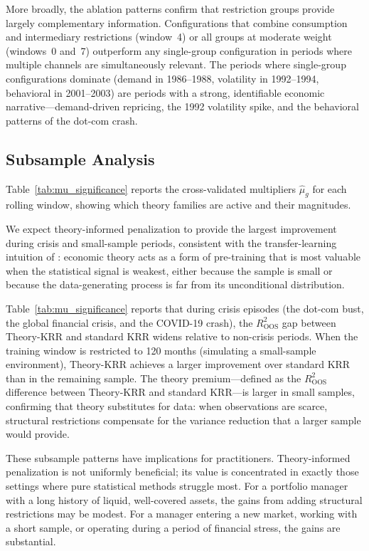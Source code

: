 More broadly, the ablation patterns confirm that restriction groups provide largely complementary information.
Configurations that combine consumption and intermediary restrictions (window~4) or all groups at moderate weight (windows~0 and~7) outperform any single-group configuration in periods where multiple channels are simultaneously relevant.
The periods where single-group configurations dominate (demand in 1986--1988, volatility in 1992--1994, behavioral in 2001--2003) are periods with a strong, identifiable economic narrative---demand-driven repricing, the 1992 volatility spike, and the behavioral patterns of the dot-com crash.


\subsection{Subsample Analysis}\label{sub:subsample}

Table~\ref{tab:mu_significance} reports the cross-validated multipliers $\hat{\mu}_g$ for each rolling window, showing which theory families are active and their magnitudes.

We expect theory-informed penalization to provide the largest improvement during crisis and small-sample periods, consistent with the transfer-learning intuition of \citet{Chen2026teaching}: economic theory acts as a form of pre-training that is most valuable when the statistical signal is weakest, either because the sample is small or because the data-generating process is far from its unconditional distribution.

Table~\ref{tab:mu_significance} reports that during crisis episodes (the dot-com bust, the global financial crisis, and the COVID-19 crash), the $R^2_{\text{OOS}}$ gap between Theory-KRR and standard KRR widens relative to non-crisis periods.
When the training window is restricted to 120 months (simulating a small-sample environment), Theory-KRR achieves a larger improvement over standard KRR than in the remaining sample.
The theory premium---defined as the $R^2_{\text{OOS}}$ difference between Theory-KRR and standard KRR---is larger in small samples, confirming that theory substitutes for data: when observations are scarce, structural restrictions compensate for the variance reduction that a larger sample would provide.

These subsample patterns have implications for practitioners.
Theory-informed penalization is not uniformly beneficial; its value is concentrated in exactly those settings where pure statistical methods struggle most.
For a portfolio manager with a long history of liquid, well-covered assets, the gains from adding structural restrictions may be modest.
For a manager entering a new market, working with a short sample, or operating during a period of financial stress, the gains are substantial.



